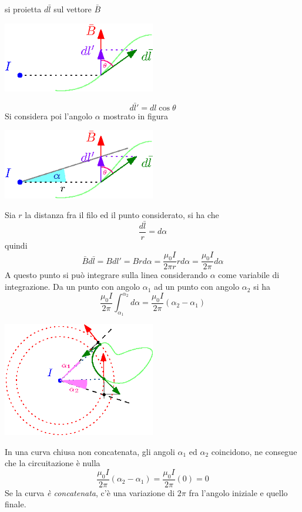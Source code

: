 \documentclass[10pt, letterpaper]{report}
\begin{document}
si proietta $d\bar l$ sul vettore $\bar B$
\begin{center}
    \includegraphics[width=0.5\textwidth ]{images/dimAmpere1.eps}
\end{center}
$$ d\bar l'=dl\cos\theta$$
Si considera poi l'angolo $\alpha$ mostrato in figura 
\begin{center}
    \includegraphics[width=0.5\textwidth ]{images/dimAmpere2.eps}
\end{center}
Sia $r$ la distanza fra il filo ed il punto considerato, si ha che 
$$ \frac{d\bar l}{r}=d\alpha$$
quindi 
$$ \bar B d\bar l=Bdl'=Brd\alpha=\frac{\mu_0I}{2\pi r}rd\alpha = \frac{\mu_0I}{2\pi}d\alpha$$
A questo punto si può integrare sulla linea considerando $\alpha$ come variabile di integrazione. Da un punto con angolo $\alpha_1$ ad un punto con angolo $\alpha_2$ si ha 
$$  \frac{\mu_0I}{2\pi}\int_{\alpha_1}^{\alpha_2}d\alpha= \frac{\mu_0I}{2\pi}(\alpha_2-\alpha_1)$$
\begin{center}
    \includegraphics[width=0.5\textwidth ]{images/dimAmpere3.eps}
\end{center}
In una curva chiusa non concatenata, gli angoli $\alpha_1$ ed $\alpha_2$ coincidono, ne consegue che la circuitazione è nulla 
$$ \frac{\mu_0I}{2\pi}(\alpha_2-\alpha_1)= \frac{\mu_0I}{2\pi}(0)=0 $$
Se la curva \textit{è concatenata}, c'è una variazione di $2\pi$ fra l'angolo iniziale e quello finale.
\end{document}
